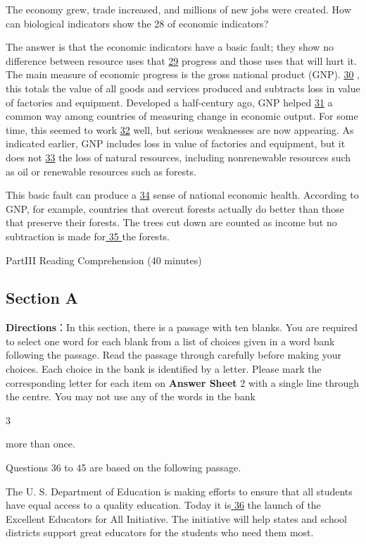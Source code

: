 \documentclass[UTF8,11pt]{ctexart}
\begin{document}
The economy grew, trade increased, and millions of new jobs were created. How can biological indicators show the 28 of economic indicators?


The answer is that the economic indicators have a basic fault; they show no difference between resource uses that \uline{29} progress and those uses that will hurt it. The main measure of economic progress is the gross national product (GNP). \uline{30} , this totals the value of all goods and services produced and subtracts loss in value of factories and equipment. Developed a half-century ago, GNP helped \uline{31} a common way among countries of measuring change in economic output. For some time, this seemed to work \uline{32} well, but serious weaknesses are now appearing. As indicated earlier, GNP includes loss in value of factories and equipment, but it does not \uline{33} the loss of natural resources, including nonrenewable resources such as oil or renewable resources such as forests.


This basic fault can produce a \uline{34} sense of national economic health. According to GNP, for example, countries that overcut forests actually do better than those that preserve their forests. The trees cut down are counted as income but no subtraction is made for\uline{ 35 }the forests.


PartIII Reading Comprehension (40 minutes)


\subsection*{Section A}


\textbf{Directions}：In this section, there is a passage with ten blanks. You are required to select one word for each blank from a list of choices given in a word bank following the passage. Read the passage through carefully before making your choices. Each choice in the bank is identified by a letter. Please mark the corresponding letter for each item on \textbf{Answer Sheet} 2 with a single line through the centre. You may not use any of the words in the bank


3


more than once.


Questions 36 to 45 are based on the following passage.


The U. S. Department of Education is making efforts to ensure that all students have equal access to a quality education. Today it is\uline{ 36} the launch of the Excellent Educators for All Initiative. The initiative will help states and school districts support great educators for the students who need them most.
\end{document}
